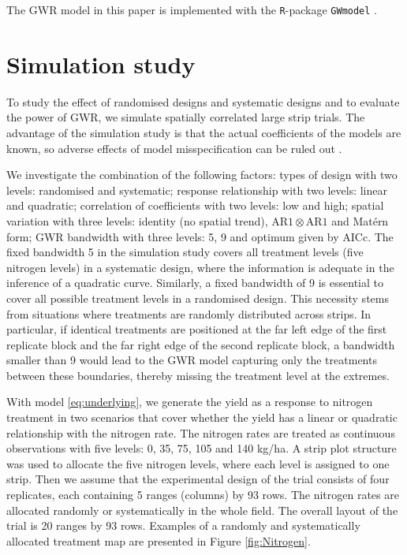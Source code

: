 \documentclass[a4paper]{article} 	%
\newcommand{\R}{\texttt{R}}
\newcommand{\Matern}{Mat\'ern }
\newcommand{\AR}{\mathrm{AR1}}
\begin{document}
The GWR model in this paper is implemented with the \R-package \texttt{GWmodel} \parencite{lu2014gwmodel, Gollini2015GWmodel}. 


\section{Simulation study}\label{Sec:Simu}

To study the effect of randomised designs and systematic designs and to evaluate the power of GWR, we simulate spatially correlated large strip trials. The advantage of the simulation study is that the actual coefficients of the models are known, so adverse effects of model misspecification
can be ruled out \parencite{Piepho2013Why}. 

We investigate the combination of the following factors: types of design with two levels: randomised and systematic; response relationship with two levels: linear and quadratic; correlation of coefficients with two levels: low and high; spatial variation with three levels: identity (no spatial trend), $\AR\otimes\AR$ and \Matern form; GWR bandwidth with three levels: 5, 9 and optimum given by AICc. The fixed bandwidth 5 in the simulation study covers all treatment levels (five nitrogen levels) in a systematic design, where the information is adequate in the inference of a quadratic curve. Similarly, a fixed bandwidth of 9 is essential to cover all possible treatment levels in a randomised design. This necessity stems from situations where treatments are randomly distributed across strips. In particular, if identical treatments are positioned at the far left edge of the first replicate block and the far right edge of the second replicate block, a bandwidth smaller than 9 would lead to the GWR model capturing only the treatments between these boundaries, thereby missing the treatment level at the extremes.


With model \eqref{eq:underlying}, we generate the yield as a response to nitrogen treatment in two scenarios that cover whether the yield has a linear or quadratic relationship with the nitrogen rate. The nitrogen rates are treated as continuous observations with five levels: 0, 35, 75, 105 and 140 kg/ha. A strip plot structure was used to allocate the five nitrogen levels, where each level is assigned to one strip. Then we assume that the experimental design of the trial consists of four replicates, each containing 5 ranges (columns) by 93 rows. The nitrogen rates are allocated randomly or systematically in the whole field. The overall layout of the trial is 20 ranges by 93 rows. Examples of a randomly and systematically allocated treatment map are presented in Figure \ref{fig:Nitrogen}. 
\end{document}
